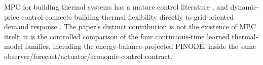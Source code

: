 \documentclass[11pt]{article}
\begin{document}
MPC for building thermal systems has a mature control literature
\citep{ma2012predictive,afram2014review,killian2016ten,drgona2020all}, and dynamic-price control
connects building thermal flexibility directly to grid-oriented demand response
\citep{avci2013price,amin2020price,zanetti2025flex}.  The paper's distinct contribution is not
the existence of MPC itself; it is the controlled comparison of the four continuous-time learned
thermal-model families, including the energy-balance-projected PINODE, inside the same
observer/forecast/actuator/economic-control contract.



\end{document}
